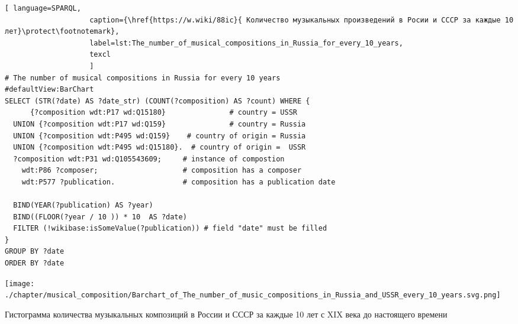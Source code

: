 \begin{lstlisting}[ language=SPARQL,
                    caption={\href{https://w.wiki/88ic}{ Количество музыкальных произведений в Росии и СССР за каждые 10 лет}\protect\footnotemark},
                    label=lst:The_number_of_musical_compositions_in_Russia_for_every_10_years,
                    texcl 
                    ]
# The number of musical compositions in Russia for every 10 years
#defaultView:BarChart
SELECT (STR(?date) AS ?date_str) (COUNT(?composition) AS ?count) WHERE {
      {?composition wdt:P17 wd:Q15180}               # country = USSR
  UNION {?composition wdt:P17 wd:Q159}               # country = Russia
  UNION {?composition wdt:P495 wd:Q159}    # country of origin = Russia
  UNION {?composition wdt:P495 wd:Q15180}.  # country of origin =  USSR
  ?composition wdt:P31 wd:Q105543609;     # instance of compostion
    wdt:P86 ?composer;                    # composition has a composer
    wdt:P577 ?publication.                # composition has a publication date

  BIND(YEAR(?publication) AS ?year)
  BIND((FLOOR(?year / 10 )) * 10  AS ?date)
  FILTER (!wikibase:isSomeValue(?publication)) # field "date" must be filled
}
GROUP BY ?date
ORDER BY ?date
\end{lstlisting}%


\newpage
\begin{marginfigure}[0\baselineskip]
	\texttt{[image: ./chapter/musical\_composition/Barchart\_of\_The\_number\_of\_music\_compositions\_in\_Russia\_and\_USSR\_every\_10\_years.svg.png]}
	\caption[Гистограмма количества музыкальных композиций в России и СССР за каждые 10 лет с XIX века до настоящего времени]{Гистограмма количества музыкальных композиций в России и СССР за каждые 10 лет с XIX века до настоящего времени}%
\end{marginfigure}

